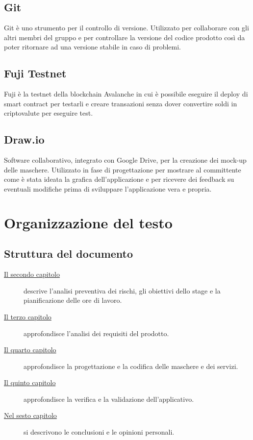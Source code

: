 \subsection*{Git}
Git è uno strumento per il controllo di versione. Utilizzato per collaborare con gli altri membri del gruppo e per controllare la versione del codice prodotto così da poter ritornare ad una versione stabile in caso di problemi.

\subsection*{Fuji Testnet}
Fuji è la testnet della blockchain Avalanche in cui è possibile eseguire il deploy di smart contract per testarli e creare transazioni senza dover convertire soldi in criptovalute per eseguire test.

\subsection*{Draw.io}
Software collaborativo, integrato con Google Drive, per la creazione dei mock-up delle maschere. Utilizzato in fase di progettazione per mostrare al committente come è stata ideata la grafica dell’applicazione e per ricevere dei feedback su eventuali modifiche prima di sviluppare l’applicazione vera e propria.

\section{Organizzazione del testo}
\subsection{Struttura del documento}
\begin{description}

    \item[{\hyperref[cap:descrizione-stage]{Il secondo capitolo}}] descrive l’analisi preventiva dei rischi, gli obiettivi dello stage e la pianificazione delle ore di lavoro.
    
    \item[{\hyperref[cap:analisi-requisiti]{Il terzo capitolo}}] approfondisce l'analisi dei requisiti del prodotto.
    
    \item[{\hyperref[cap:progettazione-codifica]{Il quarto capitolo}}] approfondisce la progettazione e la codifica delle maschere e dei servizi.
    
    \item[{\hyperref[cap:verifica-validazione]{Il quinto capitolo}}] approfondisce la verifica e la validazione dell'applicativo.
    
    \item[{\hyperref[cap:conclusioni]{Nel sesto capitolo}}] si descrivono le conclusioni e le opinioni personali.
\end{description}

